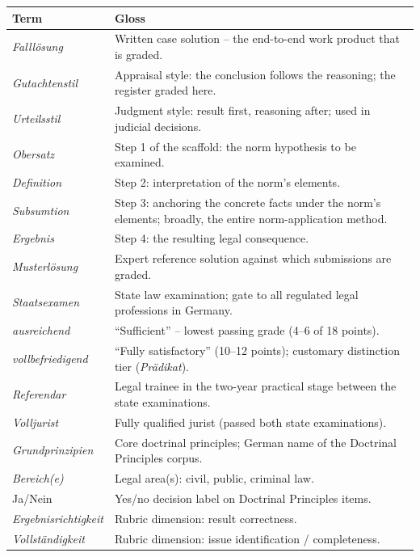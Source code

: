 \begin{table}[t]
\centering
\footnotesize
\setlength{\tabcolsep}{5pt}
\begin{tabular}{@{}p{}p{}@{}}
\toprule
\textbf{Term} & \textbf{Gloss} \\
\midrule
\emph{Falllösung} & Written case solution -- the end-to-end work product that is graded. \\
\emph{Gutachtenstil} & Appraisal style: the conclusion follows the reasoning; the register graded here. \\
\emph{Urteilsstil} & Judgment style: result first, reasoning after; used in judicial decisions. \\
\emph{Obersatz} & Step 1 of the scaffold: the norm hypothesis to be examined. \\
\emph{Definition} & Step 2: interpretation of the norm's elements. \\
\emph{Subsumtion} & Step 3: anchoring the concrete facts under the norm's elements; broadly, the entire norm-application method. \\
\emph{Ergebnis} & Step 4: the resulting legal consequence. \\
\emph{Musterlösung} & Expert reference solution against which submissions are graded. \\
\emph{Staatsexamen} & State law examination; gate to all regulated legal professions in Germany. \\
\emph{ausreichend} & ``Sufficient'' -- lowest passing grade (4--6 of 18 points). \\
\emph{vollbefriedigend} & ``Fully satisfactory'' (10--12 points); customary distinction tier (\emph{Prädikat}). \\
\emph{Referendar} & Legal trainee in the two-year practical stage between the state examinations. \\
\emph{Volljurist} & Fully qualified jurist (passed both state examinations). \\
\emph{Grundprinzipien} & Core doctrinal principles; German name of the Doctrinal Principles corpus. \\
\emph{Bereich(e)} & Legal area(s): civil, public, criminal law. \\
Ja/Nein & Yes/no decision label on Doctrinal Principles items. \\
\emph{Ergebnisrichtigkeit} & Rubric dimension: result correctness. \\
\emph{Vollständigkeit} & Rubric dimension: issue identification / completeness. \\

\end{tabular}
\end{table}

